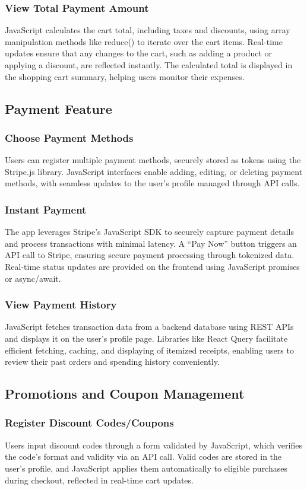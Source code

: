 \documentclass[conference]{IEEEtran}
\begin{document}
\subsubsection{View Total Payment Amount}
JavaScript calculates the cart total, including taxes and discounts, using array manipulation methods like reduce() to iterate over the cart items. Real-time updates ensure that any changes to the cart, such as adding a product or applying a discount, are reflected instantly. The calculated total is displayed in the shopping cart summary, helping users monitor their expenses.
\subsection{Payment Feature}
\subsubsection{Choose Payment Methods}
Users can register multiple payment methods, securely stored as tokens using the Stripe.js library. JavaScript interfaces enable adding, editing, or deleting payment methods, with seamless updates to the user’s profile managed through API calls.
\subsubsection{Instant Payment}
The app leverages Stripe’s JavaScript SDK to securely capture payment details and process transactions with minimal latency. A “Pay Now” button triggers an API call to Stripe, ensuring secure payment processing through tokenized data. Real-time status updates are provided on the frontend using JavaScript promises or async/await.
\subsubsection{View Payment History}
JavaScript fetches transaction data from a backend database using REST APIs and displays it on the user’s profile page. Libraries like React Query facilitate efficient fetching, caching, and displaying of itemized receipts, enabling users to review their past orders and spending history conveniently.
\subsection{Promotions and Coupon Management}
\subsubsection{Register Discount Codes/Coupons}
Users input discount codes through a form validated by JavaScript, which verifies the code's format and validity via an API call. Valid codes are stored in the user’s profile, and JavaScript applies them automatically to eligible purchases during checkout, reflected in real-time cart updates.
\end{document}
